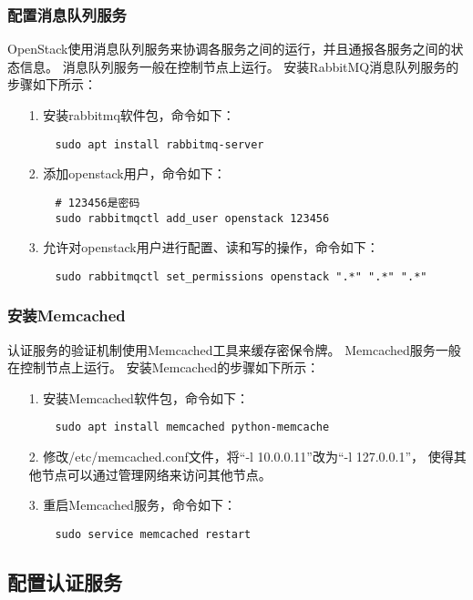 \documentclass[a4paper,left=2.5cm,right=2.5cm,11pt]{article}
\begin{document}
\subsubsection{配置消息队列服务}
	OpenStack使用消息队列服务来协调各服务之间的运行，并且通报各服务之间的状态信息。
	消息队列服务一般在控制节点上运行。
	安装RabbitMQ消息队列服务的步骤如下所示：
	\begin{itemize}
		\item[1.] 安装rabbitmq软件包，命令如下：
		\begin{lstlisting}
	sudo apt install rabbitmq-server
		\end{lstlisting}

		\item[2.] 添加openstack用户，命令如下：
		\begin{lstlisting}
	# 123456是密码
	sudo rabbitmqctl add_user openstack 123456
		\end{lstlisting}

		\item[3.] 允许对openstack用户进行配置、读和写的操作，命令如下：
		\begin{lstlisting}
	sudo rabbitmqctl set_permissions openstack ".*" ".*" ".*"
		\end{lstlisting}
	\end{itemize}

\subsubsection{安装Memcached}
	认证服务的验证机制使用Memcached工具来缓存密保令牌。
	Memcached服务一般在控制节点上运行。
	安装Memcached的步骤如下所示：
	\begin{itemize}
		\item[1.] 安装Memcached软件包，命令如下：
		\begin{lstlisting}
	sudo apt install memcached python-memcache
		\end{lstlisting}

		\item[2.] 修改/etc/memcached.conf文件，将“-l 10.0.0.11”改为“-l 127.0.0.1”，
		使得其他节点可以通过管理网络来访问其他节点。

		\item[3.] 重启Memcached服务，命令如下：
		\begin{lstlisting}
	sudo service memcached restart
		\end{lstlisting}
	\end{itemize}

\subsection{配置认证服务}
\end{document}

